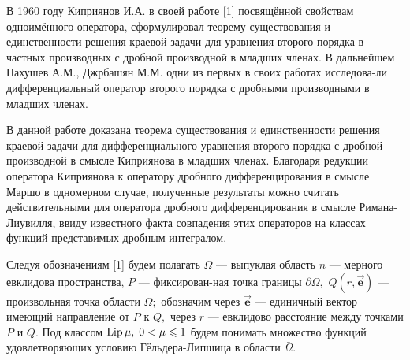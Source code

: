 




  В 1960 году  Киприянов И.А. в своей работе  [1] посвящённой свойствам одноимённого оператора,
 сформулировал теорему существования и единственности решения краевой задачи для   уравнения  второго порядка в частных производных  с дробной производной в младших членах.
  В дальнейшем   Нахушев А.М., Джрбашян М.М.  одни из первых в своих работах исследова-ли дифференциальный оператор второго порядка с дробными производными в младших членах.

В данной работе доказана теорема существования и единст\-венности решения
краевой задачи для диф\-фе\-рен\-ци\-а\-ль\-но\-го уравнения
второго порядка с дробной производной в смысле Киприянова в младших членах.
Благодаря редукции оператора Киприянова к оператору дробного дифференцирования в смысле Маршо в одномерном случае,
полученные результаты можно считать действительными для оператора дробного дифференцирования в смысле Римана-Лиувилля,
ввиду известного факта совпадения этих операторов на классах функций представимых дробным интегралом.


  Следуя обозначениям [1] будем полагать $\Omega$ --- выпуклая область $n$ --- мерного евклидова пространства, $P$ --- фиксирован-ная точка границы $\partial\Omega,$
     $Q(r,\vec{\mathbf{e}})$ --- произвольная точка области $\Omega;$
     обозначим через $\vec{\mathbf{e}}$ --- единичный вектор имеющий направление от $P$ к $Q,$ через $r$ --- евклидово расстояние между точками $P$ и $Q.$
    Под классом ${\rm Lip}\, \mu,\;0<\mu\leqslant1 $ будем понимать множество функций удовлетворяющих условию Гёльдера-Липшица в области $\bar{\Omega}.$

